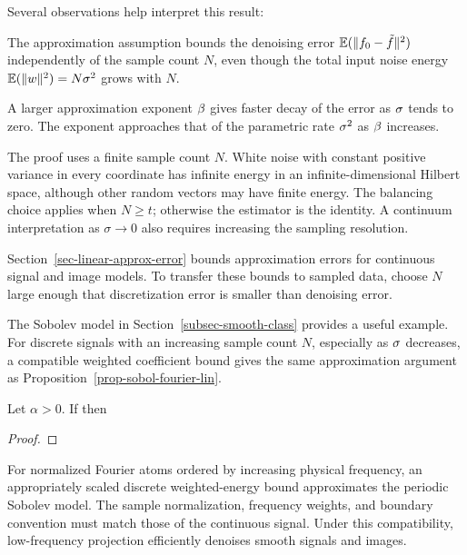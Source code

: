 Several observations help interpret this result:
\begin{rs}
	\item The approximation assumption bounds the denoising error $\mathbb E(\lVert f_0 - \tilde f\rVert^2)$ independently of the sample count $N$, even though the total input noise energy $\mathbb E(\lVert w\rVert^2)=N\sigma^2$ grows with $N$.
	\item A larger approximation exponent $\beta$ gives faster decay of the error as $\sigma$ tends to zero. The exponent approaches that of the parametric rate $\sigma^2$ as $\beta$ increases.
	\item The proof uses a finite sample count $N$. White noise with constant positive variance in every coordinate has infinite energy in an infinite-dimensional Hilbert space, although other random vectors may have finite energy. The balancing choice applies when $N\geq t$; otherwise the estimator is the identity. A continuum interpretation as $\sigma\to0$ also requires increasing the sampling resolution.
	\item Section~\ref{sec-linear-approx-error} bounds approximation errors for continuous signal and image models. To transfer these bounds to sampled data, choose $N$ large enough that discretization error is smaller than denoising error.
\end{rs}

The Sobolev model in Section~\ref{subsec-smooth-class} provides a useful example. For discrete signals with an increasing sample count $N$, especially as $\sigma$ decreases, a compatible weighted coefficient bound gives the same approximation argument as Proposition~\ref{prop-sobol-fourier-lin}.

\begin{prop}
	Let $\alpha>0$. If
	then
\end{prop}
\begin{proof}
\end{proof}

For normalized Fourier atoms ordered by increasing physical frequency, an appropriately scaled discrete weighted-energy bound approximates the periodic Sobolev model. The sample normalization, frequency weights, and boundary convention must match those of the continuous signal. Under this compatibility, low-frequency projection efficiently denoises smooth signals and images.

